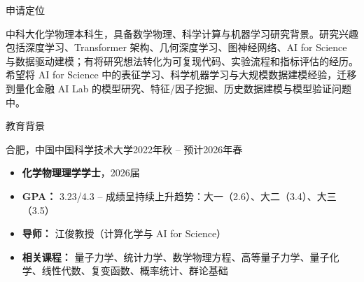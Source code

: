 \documentclass[]{mcdowellcv}
\begin{document}
\address{Xiangyu Xie \linebreak 中国科学技术大学 \linebreak 化学物理系，2026届}

\makeheader

\begin{cvsection}{申请定位}
	\begin{cvsubsection}{}{}{}
		中科大化学物理本科生，具备数学物理、科学计算与机器学习研究背景。研究兴趣包括深度学习、Transformer 架构、几何深度学习、图神经网络、AI for Science 与数据驱动建模；有将研究想法转化为可复现代码、实验流程和指标评估的经历。希望将 AI for Science 中的表征学习、科学机器学习与大规模数据建模经验，迁移到量化金融 AI Lab 的模型研究、特征/因子挖掘、历史数据建模与模型验证问题中。
	\end{cvsubsection}
\end{cvsection}

\begin{cvsection}{教育背景}
	\begin{cvsubsection}{合肥，中国}{中国科学技术大学}{2022年秋 -- 预计2026年春}
		\begin{itemize}
			\item \textbf{化学物理理学学士}，2026届
			\item \textbf{GPA：} 3.23/4.3 -- 成绩呈持续上升趋势：大一（2.6）、大二（3.4）、大三（3.5）
			\item \textbf{导师：} 江俊教授（计算化学与 AI for Science）
			\item \textbf{相关课程：} 量子力学、统计力学、数学物理方程、高等量子力学、量子化学、线性代数、复变函数、概率统计、群论基础
		\end{itemize}
	\end{cvsubsection}
\end{cvsection}
\end{document}
